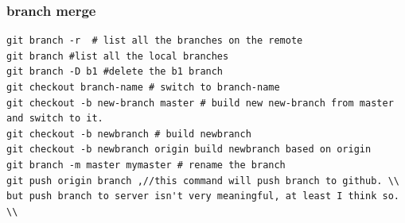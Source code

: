 \documentclass[a4paper,12pt,twoside]{book}
\begin{document}
\begin{itemize}
\begin{itemize}
\begin{itemize}





\end{itemize}

\subsubsection{branch merge}

\begin{verbatim}
git branch -r  # list all the branches on the remote
git branch #list all the local branches
git branch -D b1 #delete the b1 branch
git checkout branch-name # switch to branch-name
git checkout -b new-branch master # build new new-branch from master and switch to it.
git checkout -b newbranch # build newbranch
git checkout -b newbranch origin build newbranch based on origin
git branch -m master mymaster # rename the branch
git push origin branch ,//this command will push branch to github. \\
but push branch to server isn't very meaningful, at least I think so. \\
\end{verbatim}


\end{itemize}
\end{itemize}
\end{document}
